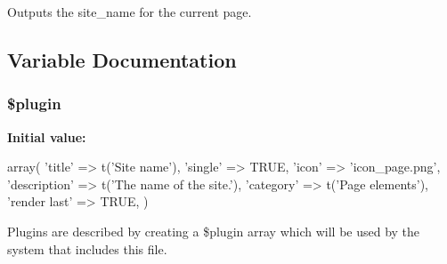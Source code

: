 Outputs the site\_\-name for the current page. 

\subsection{Variable Documentation}
\hypertarget{page__site__name_8inc_ada8a7130088351710bb02ed622d6bf65}{
\subsubsection[{\$plugin}]{\setlength{\rightskip}{0pt plus 5cm}\$plugin}}
\label{page__site__name_8inc_ada8a7130088351710bb02ed622d6bf65}
{\bfseries Initial value:}
\begin{DoxyCode}
 array(
  'title' => t('Site name'),
  'single' => TRUE,
  'icon' => 'icon_page.png',
  'description' => t('The name of the site.'),
  'category' => t('Page elements'),
  'render last' => TRUE,
)
\end{DoxyCode}
Plugins are described by creating a \$plugin array which will be used by the system that includes this file. 